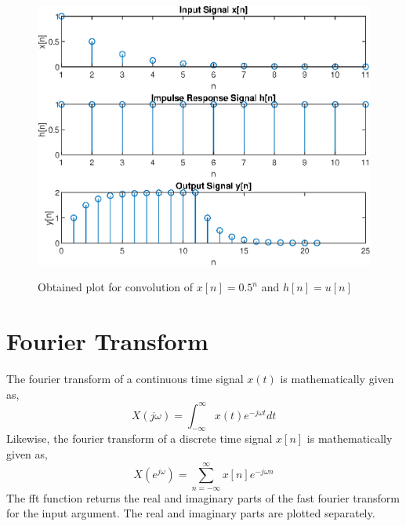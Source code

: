 \documentclass{lab_sheet}
\begin{document}
    \begin{figure}[H]
        \centering
        \includegraphics[scale=0.6]{./Figures/dis_convo_2}
        \label{fig:conv2}
        \caption{Obtained plot for convolution of $x[n]=0.5^n$ and $h[n]=u[n]$}
    \end{figure}

    \section{Fourier Transform}
    The fourier transform of a continuous time signal $x(t)$ is mathematically given as,
    $$
    X(j\omega) = \int_{-\infty}^{\infty} x(t) e^{-j\omega t} dt
    $$
    Likewise, the fourier transform of a discrete time signal $x[n]$ is mathematically given as,
    $$
    X(e^{j\omega})=\sum_{n=-\infty}^{\infty} x[n] e^{-j\omega n}
    $$
    The fft function returns the real and imaginary parts of the fast fourier transform for the input argument. The real and imaginary parts are plotted separately.
\end{document}
